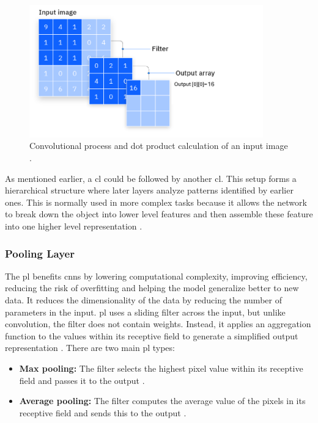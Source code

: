 \begin{figure}[!ht]
    \centering
    \includegraphics[width=0.9\textwidth]{Figures/CNN_CL.PNG}
    \caption{Convolutional process and dot product calculation of an input image \cite{ibm_cnn}.}
    \label{cnn_cl}
\end{figure}

As mentioned earlier, a \gls{cl} could be followed by another \gls{cl}. This setup forms a hierarchical structure where later layers analyze patterns identified by earlier ones. This is normally used in more complex tasks because it allows the network to break down the object into lower level features and then assemble these feature into one higher level representation \cite{ibm_cnn}.

\subsubsection{Pooling Layer}
The \gls{pl} benefits \gls{cnn}s by lowering computational complexity, improving efficiency, reducing the risk of overfitting and helping the model generalize better to new data. It reduces the dimensionality of the data by reducing the number of parameters in the input. \gls{pl} uses a sliding filter across the input, but unlike convolution, the filter does not contain weights. Instead, it applies an aggregation function to the values within its receptive field to generate a simplified output representation \cite{ibm_cnn}. There are two main \gls{pl} types:

\begin{itemize}
    \item \textbf{Max pooling:} The filter selects the highest pixel value within its receptive field and passes it to the output \cite{ibm_cnn}.
     \item \textbf{Average pooling:} The filter computes the average value of the pixels in its receptive field and sends this to the output \cite{ibm_cnn}.
\end{itemize}

